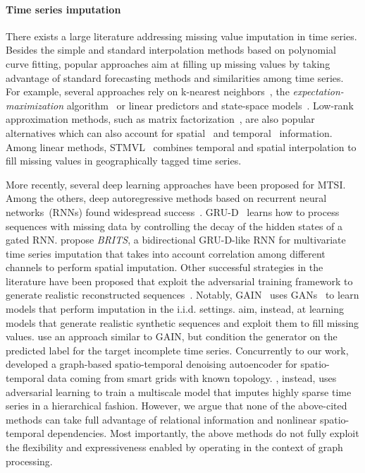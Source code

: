 \documentclass{article} \usepackage{iclr2022_conference,times}
\begin{document}
\paragraph{Time series imputation} There exists a large literature addressing missing value imputation in time series. Besides the simple and standard interpolation methods based on polynomial curve fitting, popular approaches aim at filling up missing values by taking advantage of standard forecasting methods and similarities among time series. For example, several approaches rely on k-nearest neighbors~\citep{troyanskaya2001missing, beretta2016nearest}, the \emph{expectation-maximization} algorithm~\citep{ghahramani1994supervised, nelwamondo2007missing} or linear predictors and state-space models~\citep{durbin2012time, kihoro2013imputation}. Low-rank approximation methods, such as matrix factorization~\citep{cichocki2009fast}, are also popular alternatives which can also account for spatial~\citep{cai2010graph, rao2015collaborative} and temporal~\citep{yu2016temporal, mei2017nonnegative} information. Among linear methods, STMVL~\citep{yi2016stmvl} combines temporal and spatial interpolation to fill missing values in geographically tagged time series. 

More recently, several deep learning approaches have been proposed for MTSI. Among the others, deep autoregressive methods based on recurrent neural networks~(RNNs) found widespread success~\citep{lipton2016directly, che2018recurrent, luo2018multivariate, yoon2018estimating, cao2018brits}. GRU-D~\citep{che2018recurrent} learns how to process sequences with missing data by controlling the decay of the hidden states of a gated RNN. \citet{cao2018brits} propose \emph{BRITS}, a bidirectional GRU-D-like RNN for multivariate time series imputation that takes into account correlation among different channels to perform spatial imputation. Other successful strategies in the literature have been proposed that exploit the adversarial training framework to generate realistic reconstructed sequences~\citep{yoon2018gain, fedus2018maskgan, luo2018multivariate, luo2019e2gan}. Notably, GAIN~\citep{yoon2018gain} uses GANs~\citep{goodfellow2014generative} to learn models that perform imputation in the i.i.d. settings. \citet{luo2018multivariate, luo2019e2gan} aim, instead, at learning models that generate realistic synthetic sequences and exploit them to fill missing values. \citet{miao2021generative} use an approach similar to GAIN, but condition the generator on the predicted label for the target incomplete time series. Concurrently to our work,~\citet{kuppannagari2021spatio} developed a graph-based spatio-temporal denoising autoencoder for spatio-temporal data coming from smart grids with known topology.
\citet{liu2019naomi}, instead, uses adversarial learning to train a multiscale model that imputes highly sparse time series in a hierarchical fashion. However, we argue that none of the above-cited methods can take full advantage of relational information and nonlinear spatio-temporal dependencies. Most importantly, the above methods do not fully exploit the flexibility and expressiveness enabled by operating in the context of graph processing.
\end{document}
